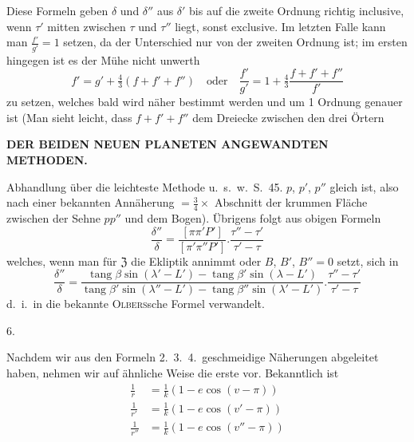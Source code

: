 Diese Formeln geben $\delta$ und $\delta''$ aus $\delta'$ bis auf die zweite Ordnung richtig inclusive, wenn $\tau'$ mitten zwischen $\tau$ und $\tau''$ liegt, sonst exclusive. Im letzten Falle kann man $\frac{f'}{g'}=1$ setzen, da der Unterschied nur von der zweiten Ordnung ist; im ersten hingegen ist es der Mühe nicht unwerth
\[
f'=g'+\tfrac43(f+f'+f'')\quad\text{oder}\quad\frac{f'}{g'}=1+\tfrac43\frac{f+f'+f''}{f'}
\]
zu setzen, welches bald wird näher bestimmt werden und um 1 Ordnung genauer ist (Man sieht leicht, dass $f+f'+f''$ dem Dreiecke zwischen den drei Örtern
\par\clearpage
\endgroup
\begingroup
\pagestyle{empty}
\newcommand{\GaussVIGathering}[2]{%
  \fancypagestyle{gaussVIGathering}{%
    \fancyhf{}%
    \renewcommand{\headrulewidth}{0pt}%
    \renewcommand{\footrulewidth}{0pt}%
    \fancyfoot[C]{\makebox[\textwidth][l]{%
      \hspace*{.025\textwidth}{\footnotesize\bfseries #1}\hfill
      {\normalsize\bfseries #2}\hspace*{.18\textwidth}}}%
  }%
  \thispagestyle{gaussVIGathering}%
}
\thispagestyle{empty}
\noindent{}%
\makebox[12mm][l]{}%
\parbox[t]{\dimexpr\linewidth-24mm\relax}{\centering\fontsize{7.4}{9.2}\selectfont\bfseries DER BEIDEN NEUEN PLANETEN ANGEWANDTEN METHODEN.\par}%
\par\nobreak\smallskip
\expandafter\def\csname HistoricalNoteText10\endcsname{Abhandlung über die leichteste Methode u.\ s.\ w.\ S.\ 45.}%
\noindent $p$, $p'$, $p''$ gleich ist, also nach einer bekannten Annäherung $=\frac34\times$ Abschnitt der krummen Fläche zwischen der Sehne $pp''$ und dem Bogen). Übrigens folgt aus obigen Formeln
\[
\frac{\delta''}{\delta}=\frac{[\pi\pi'P']}{[\pi'\pi''P']}.\frac{\tau''-\tau'}{\tau'-\tau}
\]
welches, wenn man für $\mathfrak{Z}$ die Ekliptik annimmt oder $B$, $B'$, $B''=0$ setzt, sich in
\[
\frac{\delta''}{\delta}=\frac{\operatorname{tang}\beta\sin(\lambda'-L')-\operatorname{tang}\beta'\sin(\lambda-L')}{\operatorname{tang}\beta'\sin(\lambda''-L')-\operatorname{tang}\beta''\sin(\lambda'-L')}.\frac{\tau''-\tau'}{\tau'-\tau}
\]
d.\ i.\ in die bekannte \textsc{Olbers}sche Formel verwandelt.

\begin{center}6.\end{center}
\par\indent Nachdem wir aus den Formeln 2.\ 3.\ 4.\ geschmeidige Näherungen abgeleitet haben, nehmen wir auf ähnliche Weise die erste vor. Bekanntlich ist
\[
\begin{aligned}
\frac1r&=\frac1k(1-e\cos(v-\pi))\\
\frac1{r'}&=\frac1k(1-e\cos(v'-\pi))\\
\frac1{r''}&=\frac1k(1-e\cos(v''-\pi))
\end{aligned}
\]

